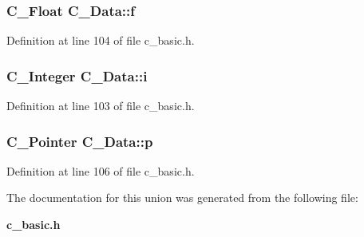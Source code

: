 \subsubsection{\setlength{\rightskip}{0pt plus 5cm}\bf{C\_\-Float} \bf{C\_\-Data::f}}\label{unionC__Data_1cc818c7a69b97e9cc6bcd166d757a12}




Definition at line 104 of file c\_\-basic.h.
\subsubsection{\setlength{\rightskip}{0pt plus 5cm}\bf{C\_\-Integer} \bf{C\_\-Data::i}}\label{unionC__Data_ffb7c1b1c10cab329f3fd11e0f26fad6}




Definition at line 103 of file c\_\-basic.h.
\subsubsection{\setlength{\rightskip}{0pt plus 5cm}\bf{C\_\-Pointer} \bf{C\_\-Data::p}}\label{unionC__Data_380e0b01802f2d02010462d81659c5a4}




Definition at line 106 of file c\_\-basic.h.

The documentation for this union was generated from the following file:\begin{CompactItemize}
\item 
\bf{c\_\-basic.h}\end{CompactItemize}
